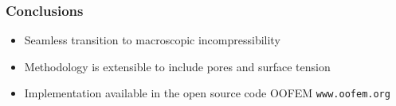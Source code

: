 \documentclass[11pt]{beamer} %
\begin{document}
\begin{frame}
 \frametitle{Conclusions}
 \begin{itemize}
 \item Seamless transition to macroscopic incompressibility
 \item Methodology is extensible to include pores and surface tension
 \item Implementation available in the open source code OOFEM \texttt{www.oofem.org}
 \end{itemize}
\end{frame}
\end{document}
